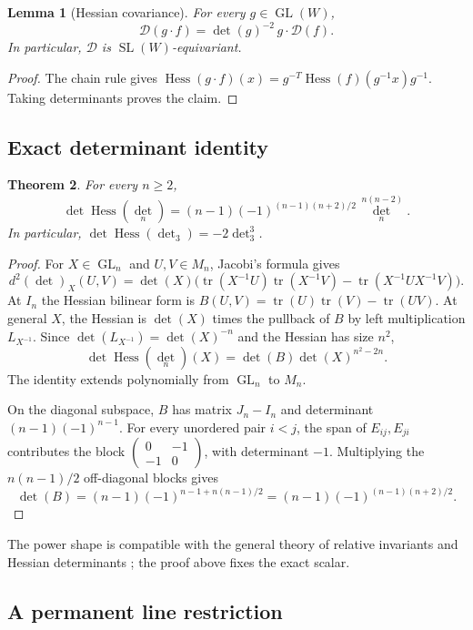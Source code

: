 \documentclass[11pt]{article}
\newtheorem{theorem}{Theorem}[section]
\newtheorem{lemma}[theorem]{Lemma}
\theoremstyle{definition}
\theoremstyle{remark}
\DeclareMathOperator{\Hess}{Hess}
\DeclareMathOperator{\tr}{tr}
\newcommand{\GL}{\operatorname{GL}}
\newcommand{\SL}{\operatorname{SL}}
\begin{document}
\begin{lemma}[Hessian covariance]\label{lem:covariance}
For every $g\in\GL(W)$,
\[
\mathcal D(g\cdot f)=\det(g)^{-2}\,g\cdot\mathcal D(f).
\]
In particular, $\mathcal D$ is $\SL(W)$-equivariant.
\end{lemma}
\begin{proof}
The chain rule gives
$\Hess(g\cdot f)(x)=g^{-T}\Hess(f)(g^{-1}x)g^{-1}$.
Taking determinants proves the claim.
\end{proof}

\subsection{Exact determinant identity}

\begin{theorem}\label{thm:det-hessian}
For every $n\ge2$,
\[
\det\Hess(\det_n)=
(n-1)(-1)^{(n-1)(n+2)/2}\det_n^{\,n(n-2)}.
\]
In particular, $\det\Hess(\det_3)=-2\det_3^3$.
\end{theorem}
\begin{proof}
For $X\in\GL_n$ and $U,V\in M_n$, Jacobi's formula gives
\[
d^2(\det)_X(U,V)=\det(X)\bigl(
\tr(X^{-1}U)\tr(X^{-1}V)-\tr(X^{-1}UX^{-1}V)\bigr).
\]
At $I_n$ the Hessian bilinear form is
$B(U,V)=\tr(U)\tr(V)-\tr(UV)$.  At general $X$, the Hessian is
$\det(X)$ times the pullback of $B$ by left multiplication
$L_{X^{-1}}$.  Since $\det(L_{X^{-1}})=\det(X)^{-n}$ and the Hessian
has size $n^2$,
\[
\det\Hess(\det_n)(X)=\det(B)\det(X)^{n^2-2n}.
\]
The identity extends polynomially from $\GL_n$ to $M_n$.

On the diagonal subspace, $B$ has matrix $J_n-I_n$ and determinant
$(n-1)(-1)^{n-1}$.  For every unordered pair $i<j$, the span of
$E_{ij},E_{ji}$ contributes the block
$\left(\begin{smallmatrix}0&-1\\-1&0\end{smallmatrix}\right)$,
with determinant $-1$.  Multiplying the $n(n-1)/2$ off-diagonal blocks gives
\[
\det(B)=(n-1)(-1)^{n-1+n(n-1)/2}
=(n-1)(-1)^{(n-1)(n+2)/2}.
\]
\end{proof}
The power shape is compatible with the general theory of relative invariants
and Hessian determinants \cite{Fox2016}; the proof above fixes the exact scalar.

\subsection{A permanent line restriction}
\end{document}
